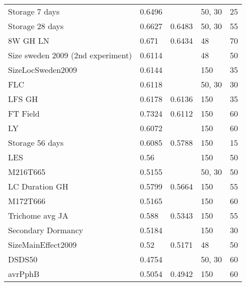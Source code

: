 \begin{longtable}{p{} p{} p{} p{} p{}}
  Storage 7 days                     & 0.6496  & \color{red}{0.65}    & 50, 30       & 25     \\
  Storage 28 days                    & 0.6627  & 0.6483               & 50, 30       & 55     \\
  8W GH LN                           & 0.671   & 0.6434               & 48           & 70     \\
  Size sweden 2009 (2nd experiment)  & 0.6114  & \color{red}{0.6268}  & 48           & 50     \\
  SizeLocSweden2009                  & 0.6144  & \color{red}{0.619}   & 150          & 35     \\
  FLC                                & 0.6118  & \color{red}{0.6161}  & 50, 30       & 30     \\
  LFS GH                             & 0.6178  & 0.6136               & 150          & 35     \\
  FT Field                           & 0.7324  & 0.6112               & 150          & 60     \\
  LY                                 & 0.6072  & \color{red}{0.6088}  & 150          & 60     \\
  Storage 56 days                    & 0.6085  & 0.5788               & 150          & 15     \\
  LES                                & 0.56    & \color{red}{0.5764}  & 150          & 50     \\
  M216T665                           & 0.5155  & \color{red}{0.5674}  & 50, 30       & 50     \\
  LC Duration GH                     & 0.5799  & 0.5664               & 150          & 55     \\
  M172T666                           & 0.5165  & \color{red}{0.5487}  & 150          & 60     \\
  Trichome avg JA                    & 0.588   & 0.5343               & 150          & 55     \\
  Secondary Dormancy                 & 0.5184  & \color{red}{0.5264}  & 150          & 30     \\
  SizeMainEffect2009                 & 0.52    & 0.5171               & 48           & 50     \\
  DSDS50                             & 0.4754  & \color{red}{0.5006}  & 50, 30       & 60     \\
  avrPphB                            & 0.5054  & 0.4942               & 150          & 60     \\

\end{longtable}
